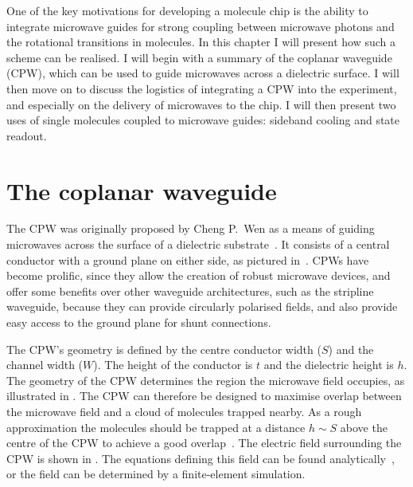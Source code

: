 One of the key motivations for developing a molecule chip is the ability to
integrate microwave guides for strong coupling between microwave photons and
the rotational transitions in molecules. In this chapter I will present how
such a scheme can be realised.  I will begin with a summary of the coplanar
waveguide (CPW), which can be used to guide microwaves across a dielectric
surface. I will then move on to discuss the logistics of integrating a CPW into
the experiment, and especially on the delivery of microwaves to the chip. I
will then present two uses of single \CaF{} molecules coupled to microwave
guides: sideband cooling and state readout.

\section{The coplanar waveguide}
\label{mws:CPW}

The CPW was originally proposed by Cheng P.~Wen as a means
of guiding microwaves across the surface of a dielectric
substrate~\cite{1127105}. It consists of a central conductor with a ground
plane on either side, as pictured in~. CPWs have become
prolific, since they allow the creation of robust microwave devices, and offer
some benefits over other waveguide architectures, such as the stripline
waveguide, because they can provide circularly polarised fields, and also
provide easy access to the ground plane for shunt connections.

The CPW's geometry is defined by the centre conductor width ($S$) and the
channel width ($W$). The height of the conductor is $t$ and the dielectric
height is $h$.  The geometry of the CPW determines the region the microwave
field occupies, as illustrated in .  The CPW
can therefore be designed to maximise overlap between the microwave field and a
cloud of molecules trapped nearby.  As a rough approximation the molecules
should be trapped at a distance $h\sim S$ above the centre of the CPW to
achieve a good overlap~\cite{Boehi2009}. The electric field surrounding the CPW is shown
in . The equations defining this field can be found
analytically~\cite{Simons2004}, or the field can be determined by a
finite-element simulation.

